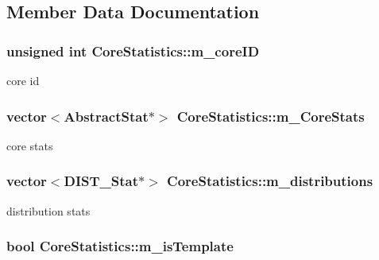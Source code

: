 \subsection{Member Data Documentation}
\hypertarget{classCoreStatistics_a1474d715511078b522b00f29bfb08c99}{
\subsubsection[{m\_\-coreID}]{\setlength{\rightskip}{0pt plus 5cm}unsigned int {\bf CoreStatistics::m\_\-coreID}}}
\label{classCoreStatistics_a1474d715511078b522b00f29bfb08c99}
core id \hypertarget{classCoreStatistics_a75d62886dba5d44a6b5dcd87ca9e25fc}{
\subsubsection[{m\_\-CoreStats}]{\setlength{\rightskip}{0pt plus 5cm}vector$<${\bf AbstractStat}$\ast$$>$ {\bf CoreStatistics::m\_\-CoreStats}}}
\label{classCoreStatistics_a75d62886dba5d44a6b5dcd87ca9e25fc}
core stats \hypertarget{classCoreStatistics_a4f8bb0a5353335409018ad3862d7279b}{
\subsubsection[{m\_\-distributions}]{\setlength{\rightskip}{0pt plus 5cm}vector$<${\bf DIST\_\-Stat}$\ast$$>$ {\bf CoreStatistics::m\_\-distributions}}}
\label{classCoreStatistics_a4f8bb0a5353335409018ad3862d7279b}
distribution stats \hypertarget{classCoreStatistics_aab80ae23a0aa22e19e3f5a2b4b4710af}{
\subsubsection[{m\_\-isTemplate}]{\setlength{\rightskip}{0pt plus 5cm}bool {\bf CoreStatistics::m\_\-isTemplate}}}
